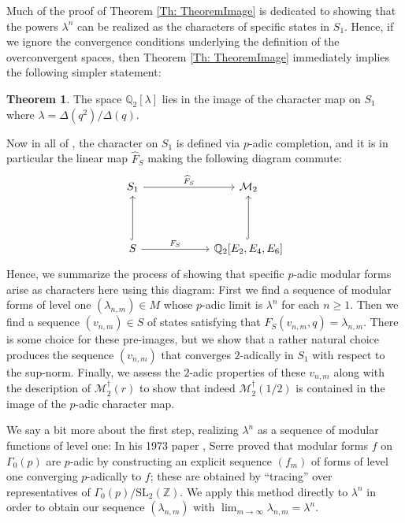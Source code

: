 \documentclass[10pt,a4paper]{amsart}
\numberwithin{equation}{section}
\theoremstyle{definition}
\newtheorem{Th}{Theorem}[section]
\newcommand{\Heis}{S}
\newcommand{\pHeis}{S_{1}}
\newcommand{\twomodforms}{\mathcal{M}_{2}}
\newcommand{\twooverconv}[1]{\twomodforms^{\dagger} (#1)}
\newcommand{\haupt}{\lambda}
\begin{document}
Much of the proof of Theorem \ref{Th: TheoremImage} is dedicated to showing that the powers $\haupt^{n}$ can be realized as the characters of specific states in $\pHeis$. Hence, if we ignore the convergence conditions underlying the definition of the overconvergent spaces, then Theorem \ref{Th: TheoremImage} immediately implies the following simpler statement:
\begin{Th} \label{Th: TheoremImage2}
    The space $\mathbb{Q}_{2}[ \haupt ]$ lies in the image of the character map on $\pHeis$ where $\haupt = \Delta (q^{2}) / \Delta (q)$.
\end{Th}
Now in all of \cite{FM22,BF24,FM23a}, the character on $\pHeis$ is defined via $p$-adic completion, and it is in particular the linear map $\widehat{F}_{\Heis}$ making the following diagram commute:
\[
\begin{tikzcd}[row sep = 4em, column sep = 6em]
    \pHeis \arrow[r,"\widehat{F}_{\Heis}"] & \twomodforms \\ \Heis \arrow[u,hook] \arrow[r,"F_{\Heis}"] & \mathbb{Q}_{2}[E_{2},E_{4},E_{6}] \arrow[u,hook]
\end{tikzcd}
\]
Hence, we summarize the process of showing that specific $p$-adic modular forms arise as characters here using this diagram: First we find a sequence of modular forms of level one $(\haupt_{n,m}) \in M$ whose $p$-adic limit is $\haupt^{n}$ for each $n \geq 1$. Then we find a sequence $(v_{n,m}) \in \Heis$ of states satisfying that $F_{\Heis}(v_{n,m},q) = \haupt_{n,m}$. There is some choice for these pre-images, but we show that a rather natural choice produces the sequence $(v_{n,m})$ that converges $2$-adically in $S_1$ with respect to the sup-norm. Finally, we assess the $2$-adic properties of these $v_{n,m}$ along with the description of $\twooverconv{r}$ to show that indeed $\twooverconv{1/2}$ is contained in the image of the $p$-adic character map.

We say a bit more about the first step, realizing $\lambda^n$ as a sequence of modular functions of level one: In his 1973 paper \cite{pSerre}, Serre proved that modular forms $f$ on $\Gamma_{0}(p)$ are $p$-adic by constructing an explicit sequence $(f_{m})$ of forms of level one converging $p$-adically to $f$; these are obtained by ``tracing'' over representatives of $\Gamma_{0}(p) / \text{SL}_{2}(\mathbb{Z})$. We apply this method directly to $\haupt^{n}$ in order to obtain our sequence $(\haupt_{n,m})$ with $\lim_{m \to \infty} \haupt_{n,m} = \haupt^{n}$. 
\end{document}
